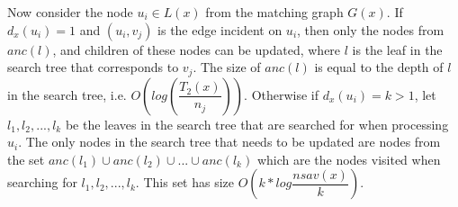 Now consider the node $u_i \in L(x)$ from the matching graph $G(x)$. If $d_x(u_i) = 1$ and $(u_i, v_j)$ is the edge incident on $u_i$, then only the nodes from $anc(l)$, and children of these nodes can be updated, where $l$ is the leaf in the search tree that corresponds to $v_j$. The size of $anc(l)$ is equal to the depth of $l$ in the search tree, i.e. $O(log(\dfrac{T_2(x)}{n_j}))$. Otherwise if $d_x(u_i) = k > 1$, let ${l_1, l_2, ..., l_k}$ be the leaves in the search tree that are searched for when processing $u_i$. The only nodes in the search tree that needs to be updated are nodes from the set ${anc(l_1) \cup anc(l_2) \cup ... \cup anc(l_k)}$ which are the nodes visited when searching for ${l_1, l_2, ..., l_k}$. This set has size $O(k*log \dfrac{nsav(x)}{k})$.







